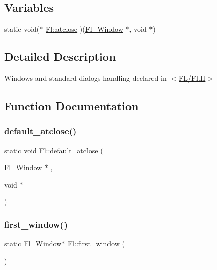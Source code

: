 \subsection*{Variables}
\begin{DoxyCompactItemize}
\item 
static void($\ast$ \hyperlink{group__fl__windows_ga62b8358ae9f5c183d1f2b92fa6a779c5}{Fl\+::atclose} )(\hyperlink{class_fl___window}{Fl\+\_\+\+Window} $\ast$, void $\ast$)
\end{DoxyCompactItemize}


\subsection{Detailed Description}
Windows and standard dialogs handling declared in $<$\hyperlink{_fl_8_h}{F\+L/\+Fl.\+H}$>$ 



\subsection{Function Documentation}
\mbox{\label{group__fl__windows_ga74bc23b2e0837cc509c18bcd56aa5dc7}} 
\subsubsection{\texorpdfstring{default\+\_\+atclose()}{default\_atclose()}}
{\footnotesize\ttfamily static void Fl\+::default\+\_\+atclose (\begin{DoxyParamCaption}\item[{\hyperlink{class_fl___window}{Fl\+\_\+\+Window} $\ast$}]{,  }\item[{void $\ast$}]{ }\end{DoxyParamCaption})\hspace{0.3cm}{\ttfamily [static]}}

\mbox{\label{group__fl__windows_gaaaaa9daf38c17c58fd895794d3f2d94d}} 
\subsubsection{\texorpdfstring{first\+\_\+window()}{first\_window()}\hspace{0.1cm}{\footnotesize\ttfamily [1/2]}}
{\footnotesize\ttfamily static \hyperlink{class_fl___window}{Fl\+\_\+\+Window}$\ast$ Fl\+::first\+\_\+window (\begin{DoxyParamCaption}{ }\end{DoxyParamCaption})\hspace{0.3cm}{\ttfamily [static]}}

